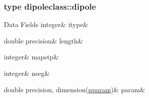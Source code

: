 \subsubsection{type dipoleclass\+::dipole}
\begin{DoxyFields}{Data Fields}
\mbox{\label{namespacedipoleclass_a488890695ad6becc93db5079e740868e}} 
integer&
itype&
\\
\hline

\mbox{\label{namespacedipoleclass_aada668e2b218b56769c64c2ec9f21dea}} 
double precision&
length&
\\
\hline

\mbox{\label{namespacedipoleclass_af0a1da636573d6878f6d1c11d0c9e5ab}} 
integer&
mapstp&
\\
\hline

\mbox{\label{namespacedipoleclass_a5f280e96dab020ba48b5b28f47b0d5fa}} 
integer&
nseg&
\\
\hline

\mbox{\label{namespacedipoleclass_a5ce0b668334f66ce50e3852ce17ddc39}} 
double precision, dimension(\mbox{\hyperlink{namespacedipoleclass_abc619199e1e9a2811da9e97630125da3}{nparam}})&
param&
\\
\hline

\end{DoxyFields}
